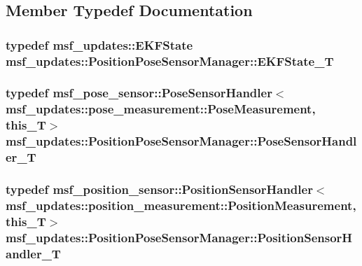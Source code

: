 \subsection{Member Typedef Documentation}
\hypertarget{classmsf__updates_1_1PositionPoseSensorManager_a13f0de4e5765110e86b20b77ffb5397c}{
\subsubsection[{E\-K\-F\-State\-\_\-\-T}]{\setlength{\rightskip}{0pt plus 5cm}typedef {\bf msf\-\_\-updates\-::\-E\-K\-F\-State} {\bf msf\-\_\-updates\-::\-Position\-Pose\-Sensor\-Manager\-::\-E\-K\-F\-State\-\_\-\-T}}}\label{classmsf__updates_1_1PositionPoseSensorManager_a13f0de4e5765110e86b20b77ffb5397c}
\hypertarget{classmsf__updates_1_1PositionPoseSensorManager_a2a693b6e7df64fdea061dc5f67fdeb3e}{
\subsubsection[{Pose\-Sensor\-Handler\-\_\-\-T}]{\setlength{\rightskip}{0pt plus 5cm}typedef msf\-\_\-pose\-\_\-sensor\-::\-Pose\-Sensor\-Handler$<$ msf\-\_\-updates\-::pose\-\_\-measurement\-::\-Pose\-Measurement, {\bf this\-\_\-\-T}$>$ {\bf msf\-\_\-updates\-::\-Position\-Pose\-Sensor\-Manager\-::\-Pose\-Sensor\-Handler\-\_\-\-T}\hspace{0.3cm}{\ttfamily [private]}}}\label{classmsf__updates_1_1PositionPoseSensorManager_a2a693b6e7df64fdea061dc5f67fdeb3e}
\hypertarget{classmsf__updates_1_1PositionPoseSensorManager_a451520e036c4a2a4c67b852bbd6d7f99}{
\subsubsection[{Position\-Sensor\-Handler\-\_\-\-T}]{\setlength{\rightskip}{0pt plus 5cm}typedef msf\-\_\-position\-\_\-sensor\-::\-Position\-Sensor\-Handler$<$ msf\-\_\-updates\-::position\-\_\-measurement\-::\-Position\-Measurement, {\bf this\-\_\-\-T}$>$ {\bf msf\-\_\-updates\-::\-Position\-Pose\-Sensor\-Manager\-::\-Position\-Sensor\-Handler\-\_\-\-T}\hspace{0.3cm}{\ttfamily [private]}}}\label{classmsf__updates_1_1PositionPoseSensorManager_a451520e036c4a2a4c67b852bbd6d7f99}
